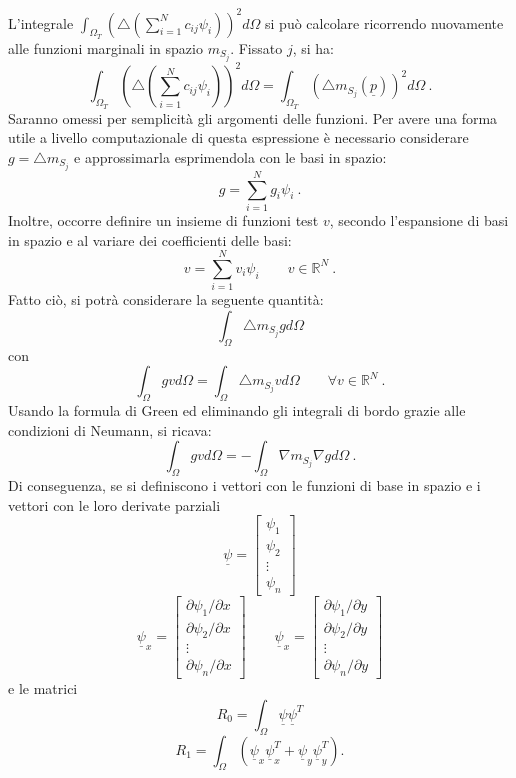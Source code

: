\documentclass[a4paper,11pt,twoside,openright]{book}							%
\begin{document}
L'integrale $\int_{\Omega_T} ( \triangle(\sum_{i=1}^N  c_{ij}\psi_i ) )^2 d \Omega$ si può calcolare  ricorrendo nuovamente alle funzioni marginali in spazio $m_{S_j}$. Fissato $j$, si ha:
$$
\int_{\Omega_T} ( \triangle(\sum_{i=1}^N  c_{ij}\psi_i ) )^2 d \Omega = \int_{\Omega_T} (\triangle m_{S_j}(\underline p))^2 d \Omega \ .
$$
Saranno omessi per semplicità gli argomenti delle funzioni. Per avere una forma utile a livello computazionale di questa espressione è necessario considerare $ g = \triangle m_{S_j} $ e approssimarla esprimendola con le basi in spazio:
$$
g=\sum_{i=1}^N  g_i\psi_i \ .
$$
Inoltre, occorre definire un insieme di funzioni test $v$, secondo l'espansione di basi in spazio e al variare dei coefficienti delle basi:
$$
v=\sum_{i=1}^N  v_i\psi_i \qquad v \in \mathbb{R}^N \ .
$$
Fatto ciò, si potrà considerare la seguente quantità:
$$
\int_\Omega \triangle m_{S_j} g d \Omega
$$
con
$$
\int_\Omega g v d \Omega= \int_\Omega \triangle m_{S_j} v d \Omega\qquad \forall v \in \mathbb{R}^N \ .
$$
Usando la formula di Green ed eliminando gli integrali di bordo grazie alle condizioni di Neumann, si ricava:
$$
\int_\Omega g v d \Omega= -\int_\Omega \nabla m_{S_j} \nabla g d \Omega \ .
$$
Di conseguenza, se si definiscono i vettori con le funzioni di base in spazio e i vettori con le loro derivate parziali
$$
\underline \psi =
\begin{bmatrix}
\psi_{1}  \\
\psi_{2}  \\
\vdots\\
\psi_{n}
\end{bmatrix}
$$
\begin{equation}
\underline \psi_x=  \begin{bmatrix}
\partial \psi_{1}/\partial x \\
\partial \psi_{2}/\partial x  \\
\vdots\\
\partial \psi_{n}/\partial x \end{bmatrix} 
\qquad
\underline \psi_x=  \begin{bmatrix}
\partial \psi_{1}/\partial y  \\
\partial \psi_{2}/\partial y  \\
\vdots\\
\partial \psi_{n}/\partial y\end{bmatrix} 
\end{equation}
e le matrici
$$ R_0 = \int_\Omega \underline \psi \underline \psi^T $$
$$ R_1 = \int_\Omega (\underline \psi_x \underline \psi_x^T + \underline \psi_y \underline \psi_y^T). $$
\end{document}
